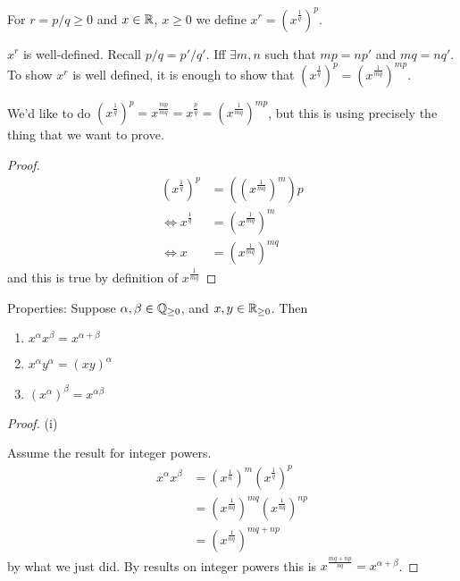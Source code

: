 \documentclass[twoside]{scrartcl}
\begin{document}
\begin{definition}
For $r = p/q \geq 0$ and $x \in\mathbb{R}$, $x \geq 0$ we define $x^r = \left(x^{\frac{1}{q}}\right)^p$.	
\end{definition}\vspace*{5pt}

\begin{remark} $x^r$ is well-defined. Recall $p/q = p'/q'$. Iff $\exists m,n$ such that $mp = np'$ and $mq = nq'$. To show $x^r$ is well defined, it is enough to show that $(x^{\frac{1}{q}})^p = ( x^{\frac{1}{mq}})^{mp}$. 

We'd like to do $(x^{\frac{1}{q}})^p = x^{\frac{mp}{mq}} = x^{\frac{p}{q}} =( x^{\frac{1}{mq}})^{mp}$, 
but this is using precisely the thing that we want to prove.

\begin{proof}
\[
\begin{aligned}
    \left(x^{\frac{1}{q}}\right)^p &= \left(\left(x^{\frac{1}{mq}}\right)^m\right)p \\
    \iff x^{\frac{1}{q}} &= \left(x^{\frac{1}{mq}}\right)^m\\
    \iff x &= \left( x^{\frac{1}{mq}}\right)^{mq} 
\end{aligned}
\]
and this is true by definition of $x^{\frac{1}{mq}}$
\end{proof}
\end{remark}


Properties: Suppose $\alpha, \beta \in \mathbb{Q}_{\geq 0}$, and $x,y \in \mathbb{R}_{\geq 0}$. Then 
\begin{enumerate}
\item $x^\alpha x^\beta = x^{\alpha + \beta}$
\item $x^{\alpha} y^{\alpha} = (xy)^{\alpha}$
\item $(x^\alpha)^\beta = x^{\alpha \beta}$
\end{enumerate}

\begin{proof} (i)

Assume the result for integer powers. 
\[
\begin{aligned}
  x^\alpha x^\beta &= \left(x^{\frac{1}{n}}\right)^m \left(x^{\frac{1}{q}}\right)^p\\
  &= \left(x^{\frac{1}{nq}}\right)^{mq} \left(x^{\frac{1}{nq}}\right)^{np}\\
  &= \left(x^{\frac{1}{nq}}\right)^{mq + np}
\end{aligned}
\]
by what we just did. By results on integer powers this is $x^{\frac{mq + np}{nq}} = x^{\alpha + \beta}$. 
\end{proof}
\end{document}

